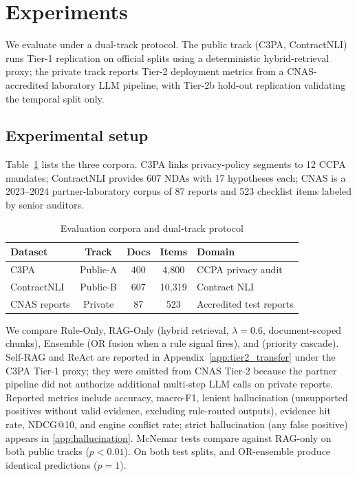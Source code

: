 \section{Experiments}
\label{sec:exp}

We evaluate \HRAG{} under a dual-track protocol. The public track (C3PA, ContractNLI) runs Tier-1 replication on official splits using a deterministic hybrid-retrieval proxy; the private track reports Tier-2 deployment metrics from a CNAS-accredited laboratory LLM pipeline, with Tier-2b hold-out replication validating the temporal split only.

\subsection{Experimental setup}

Table~\ref{tab:datasets} lists the three corpora. C3PA \cite{c3pa2024} links privacy-policy segments to 12 CCPA mandates; ContractNLI \cite{koreeda2021contractnli} provides 607 NDAs with 17 hypotheses each; CNAS is a 2023--2024 partner-laboratory corpus of 87 reports and 523 checklist items labeled by senior auditors.

\begin{table}[t]
\centering
\caption{Evaluation corpora and dual-track protocol}
\label{tab:datasets}
\small
\begin{tabular}{@{}lcccp{3.1cm}@{}}
\toprule
Dataset & Track & Docs & Items & Domain \\
\midrule
C3PA & Public-A & 400 & 4,800 & CCPA privacy audit \\
ContractNLI & Public-B & 607 & 10,319 & Contract NLI \\
CNAS reports & Private & 87 & 523 & Accredited test reports \\
\bottomrule
\end{tabular}
\end{table}

We compare Rule-Only, RAG-Only (hybrid retrieval, $\lambda=0.6$, document-scoped chunks), Ensemble (OR fusion when a rule signal fires), and \HRAG{} (priority cascade). Self-RAG \cite{asai2023selfrag} and ReAct \cite{yao2023react} are reported in Appendix~\ref{app:tier2_transfer} under the C3PA Tier-1 proxy; they were omitted from CNAS Tier-2 because the partner pipeline did not authorize additional multi-step LLM calls on private reports. Reported metrics include accuracy, macro-F1, lenient hallucination (unsupported positives without valid evidence, excluding rule-routed outputs), evidence hit rate, NDCG@10, and engine conflict rate; strict hallucination (any false positive) appears in \ref{app:hallucination}. McNemar tests compare \HRAG{} against RAG-only on both public tracks ($p<0.01$). On both test splits, \HRAG{} and OR-ensemble produce identical predictions ($p{=}1$).

